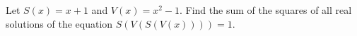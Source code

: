 Let $S(x)=x+1$ and $V(x)=x^{2}-1$. Find the sum of the squares of all real solutions of the equation $S(V(S(V(x))))=1$.
